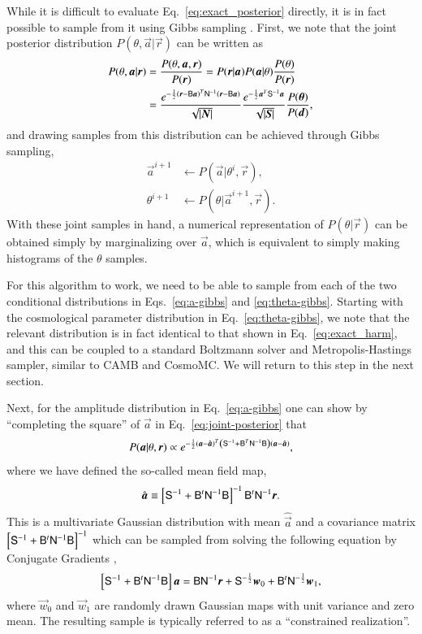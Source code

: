 \documentclass[twocolumn]{../common/aa}
\newcommand{\B}[0]{\tens{B}}
\renewcommand{\a}[0]{\vec{a}}
\newcommand{\N}[0]{\tens{N}}
\newcommand{\w}[0]{\vec{w}}
\renewcommand{\S}[0]{\tens{S}}
\renewcommand{\r}[0]{\vec{r}}
\begin{document}
While it is difficult to evaluate Eq.~\eqref{eq:exact_posterior} directly, it is in fact possible to sample from it using Gibbs sampling \citep{jewell2004,wandelt2004}. First, we note that the joint posterior distribution $P(\theta, \a | \r)$ can be written as
\begin{align}
    \nonumber
    P(\theta, \a | \r) &= \frac{P(\theta, \a, \r)}{P(\r)} = P(\r | \a)P(\a| \theta)\frac{P(\theta)}{P(\r)}\\
    \label{eq:joint-posterior}
    &= \frac{e^{-\frac12 \left(\r-\B\a \right)^T \N^{-1}\left(\r-\B\a \right)}}{\sqrt{\left|\boldsymbol{N}\right|}}
    \frac{e^{-\frac12 \a^T \S^{-1}\a}}{\sqrt{\left|\boldsymbol{S}\right|}}\frac{P(\boldsymbol{\theta})}{P(\boldsymbol{d})},
\end{align}
and drawing samples from this distribution can be achieved through Gibbs sampling,
\begin{align}
    \label{eq:a-gibbs}
    \a^{i+1} &\leftarrow P(\a | \theta^{i}, \r),\\
    \label{eq:theta-gibbs}
    \theta^{i+1} &\leftarrow P(\theta | \a^{i+1}, \r).
\end{align}
With these joint samples in hand, a numerical representation of $P(\theta | \r)$ can be obtained simply by marginalizing over $\a$, which is equivalent to simply making histograms of the $\theta$ samples.

For this algorithm to work, we need to be able to sample from each of the two conditional distributions in Eqs.~\eqref{eq:a-gibbs} and \eqref{eq:theta-gibbs}. Starting with the cosmological parameter distribution in Eq.~\ref{eq:theta-gibbs}, we note that the relevant distribution is in fact identical to that shown in Eq.~\ref{eq:exact_harm}, and this can be coupled to a standard Boltzmann solver and Metropolis-Hastings sampler, similar to CAMB and CosmoMC. We will return to this step in the next section.

Next, for the amplitude distribution in Eq.~\eqref{eq:a-gibbs} one can show by ``completing the square'' of $\a$ in Eq.~\eqref{eq:joint-posterior} that 
\begin{equation}
    P(\a | \theta, \r) \propto e^{-\frac12 \left(\a - \hat{\a}\right)^T \left(\S^{-1} + \B^T\N^{-1}\B\right) \left(\a - {\hat{\a}}\right)},
\end{equation}
where we have defined the so-called mean field map,
\begin{equation}
\label{eq:mean-field-map}
\hat{\a} \equiv \left[\S^{-1} + \B^t \N^{-1}\B \right]^{-1} \B^t \N^{-1} \r.
\end{equation}
This is a multivariate Gaussian distribution with mean $\hat{\a}$ and a covariance matrix $\left[\S^{-1} + \B^t \N^{-1}\B \right]^{-1}$ which can be sampled from solving the following equation by Conjugate Gradients \citep{shewchuk:1994,seljebotn:2019},
\begin{equation}
    \label{eq:mapmakingeq}
    \left[\S^{-1} + \B^t \N^{-1}\B \right]\a = \B \N^{-1} \r + \S^{-\frac{1}{2}}\w_0 +\B^t \N^{-\frac{1}{2}}\w_1,
\end{equation}
where $\w_0$ and $\w_1$ are randomly drawn Gaussian maps with unit variance and zero mean. The resulting sample is typically referred to as a ``constrained realization''.
\end{document}
